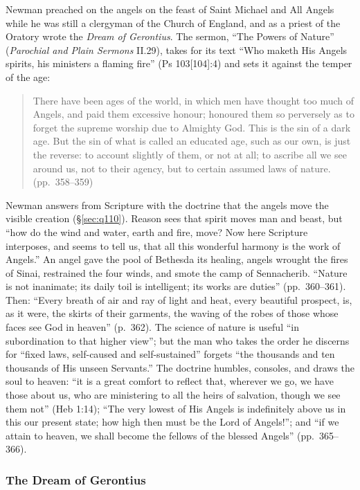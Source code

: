 Newman preached on the angels on the feast of Saint Michael and All Angels
while he was still a clergyman of the Church of England, and as a priest
of the Oratory wrote the \emph{Dream of Gerontius}. The sermon, ``The Powers of Nature'' (\emph{Parochial and Plain Sermons} II.29),
takes for its text ``Who maketh His Angels spirits, his ministers a flaming
fire'' (Ps 103[104]:4) and sets it against the temper of the age:
\begin{quote}
There have been ages of the world, in which men have thought too much of
Angels, and paid them excessive honour; honoured them so perversely as to
forget the supreme worship due to Almighty God. This is the sin of a dark
age. But the sin of what is called an educated age, such as our own, is just
the reverse: to account slightly of them, or not at all; to ascribe all we
see around us, not to their agency, but to certain assumed laws of nature.
(pp.~358--359)
\end{quote}
Newman answers from Scripture with the doctrine that the angels move the
visible creation (\S\ref{sec:q110}). Reason sees that spirit moves man and beast, but
``how do the wind and water, earth and fire, move? Now here Scripture
interposes, and seems to tell us, that all this wonderful harmony is the
work of Angels.'' An angel gave the pool of Bethesda its healing, angels
wrought the fires of Sinai, restrained the four winds, and smote the camp of
Sennacherib. ``Nature is not inanimate; its daily toil is intelligent; its
works are duties'' (pp.~360--361). Then:
``Every breath of air and ray of light and heat, every beautiful prospect,
is, as it were, the skirts of their garments, the waving of the robes of
those whose faces see God in heaven'' (p.~362). The science of nature is
useful ``in subordination to that higher view''; but the man who takes the
order he discerns for ``fixed laws, self-caused and self-sustained'' forgets
``the thousands and ten thousands of His unseen Servants.'' The doctrine
humbles, consoles, and draws the soul to heaven: ``it is a great comfort to
reflect that, wherever we go, we have those about us, who are ministering to
all the heirs of salvation, though we see them not'' (Heb 1:14); ``The very
lowest of His Angels is indefinitely above us in this our present state; how
high then must be the Lord of Angels!''; and ``if we attain to heaven, we
shall become the fellows of the blessed Angels'' (pp.~365--366).

\subsubsection{The Dream of Gerontius}

